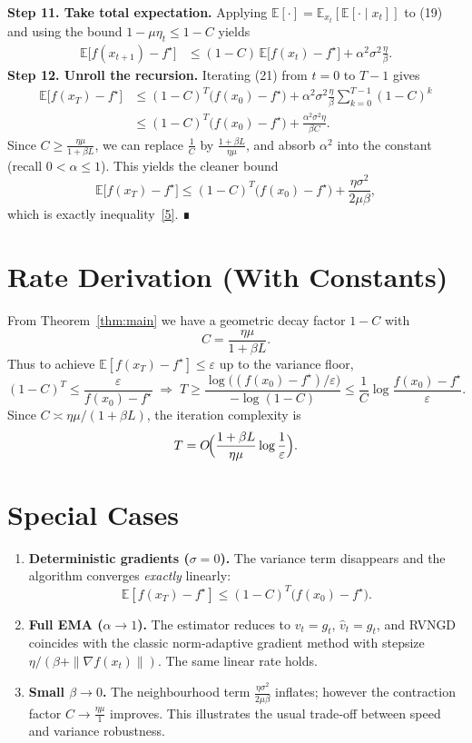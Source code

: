 \documentclass{article}
\newcommand{\E}{\mathbb{E}}
\begin{document}
\noindent\textbf{Step 11. Take total expectation.}  
Applying $\E[\cdot]=\E_{x_t}[\E[\cdot\mid x_t]]$ to (19) and using the bound $1-\mu\eta_t\le1-C$ yields
\begin{align}
    \E\!\bigl[f(x_{t+1})-f^\star\bigr]
    &\le (1-C)\,\E\!\bigl[f(x_t)-f^\star\bigr]
      +\alpha^2\sigma^2\frac{\eta}{\beta}. \tag{21}
\end{align}
\noindent\textbf{Step 12. Unroll the recursion.}  
Iterating (21) from $t=0$ to $T-1$ gives
\begin{align}
    \E\!\bigl[f(x_T)-f^\star\bigr]
    &\le (1-C)^T\bigl(f(x_0)-f^\star\bigr)
      +\alpha^2\sigma^2\frac{\eta}{\beta}\sum_{k=0}^{T-1}(1-C)^k \nonumber\\
    &\le (1-C)^T\bigl(f(x_0)-f^\star\bigr)
      +\frac{\alpha^2\sigma^2\eta}{\beta C}. \tag{22}
\end{align}
Since $C\ge\frac{\eta\mu}{1+\beta L}$, we can replace $\frac{1}{C}$ by $\frac{1+\beta L}{\eta\mu}$, and absorb $\alpha^2$ into the constant (recall $0<\alpha\le1$). This yields the cleaner bound
\[
    \E\!\bigl[f(x_T)-f^\star\bigr]
    \le (1-C)^T\bigl(f(x_0)-f^\star\bigr)
      +\frac{\eta\sigma^2}{2\mu\beta},
\]
which is exactly inequality~\eqref{5}. ∎

\section*{Rate Derivation (With Constants)}
From Theorem~\ref{thm:main} we have a geometric decay factor $1-C$ with
\[
    C=\frac{\eta\mu}{1+\beta L}.
\]
Thus to achieve $\E[f(x_T)-f^\star]\le\varepsilon$ up to the variance floor,
\[
    (1-C)^T\le\frac{\varepsilon}{f(x_0)-f^\star}
    \;\Longrightarrow\;
    T\ge\frac{\log\bigl((f(x_0)-f^\star)/\varepsilon\bigr)}{-\log(1-C)}
    \le\frac{1}{C}\log\frac{f(x_0)-f^\star}{\varepsilon}.
\]
Since $C\asymp\eta\mu/(1+\beta L)$, the iteration complexity is
\[
    T=O\!\Bigl(\frac{1+\beta L}{\eta\mu}\log\frac{1}{\varepsilon}\Bigr).
\]

\section*{Special Cases}
\begin{enumerate}[label=\arabic*.]
    \item \textbf{Deterministic gradients ($\sigma=0$).} The variance term disappears and the algorithm converges \emph{exactly} linearly:
    \[
        \E[f(x_T)-f^\star]\le(1-C)^T\bigl(f(x_0)-f^\star\bigr).
    \]
    \item \textbf{Full EMA ($\alpha\to1$).} The estimator reduces to $v_t=g_t$, $\hat v_t=g_t$, and RVNGD coincides with the classic norm‑adaptive gradient method with stepsize $\eta/(\beta+\|\nabla f(x_t)\|)$. The same linear rate holds.
    \item \textbf{Small $\beta\to0$.} The neighbourhood term $\frac{\eta\sigma^2}{2\mu\beta}$ inflates; however the contraction factor $C\to\frac{\eta\mu}{1}$ improves. This illustrates the usual trade‑off between speed and variance robustness.
\end{enumerate}
\end{document}
